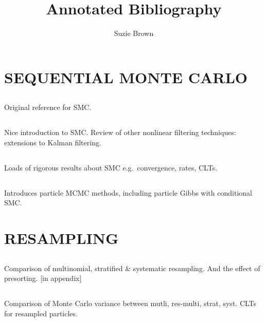 \documentclass{article}
\title{Annotated Bibliography}
\author{Suzie Brown}
\date{}
\begin{document}
\maketitle

%
\section*{SEQUENTIAL MONTE CARLO}

\subsection*{\cite{gordon1993}}
Original reference for SMC.

\subsection*{\cite{kitagawa1996}}
Nice introduction to SMC. Review of other nonlinear filtering techniques: extensions to Kalman filtering.

\subsection*{\cite{delmoral2013}}
Loads of rigorous results about SMC e.g.\ convergence, rates, CLTs.

\subsection*{\cite{doucet2009}}


\subsection*{\cite{andrieu2010}}
Introduces particle MCMC methods, including particle Gibbs with conditional SMC.

%
\section*{RESAMPLING}

\subsection*{\cite{kitagawa1996}}
Comparison of multinomial, stratified \& systematic resampling. And the effect of presorting. [in appendix]

\subsection*{\cite{douc2005}}
Comparison of Monte Carlo variance between mutli, res-multi, strat, syst. CLTs for resampled particles.
\end{document}
